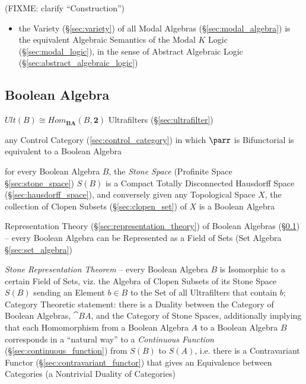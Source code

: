 (FIXME: clarify ``Construction'')

\begin{itemize}
\item the Variety (\S\ref{sec:variety}) of all Modal Algebras
  (\S\ref{sec:modal_algebra}) is the equivalent Algebraic Semantics of the Modal
  $K$ Logic (\S\ref{sec:modal_logic}), in the sense of Abstract Algebraic Logic
  (\S\ref{sec:abstract_algebraic_logic})
\end{itemize}


\subsection{Boolean Algebra}\label{sec:boolean_algebra}

$Ult(B) \cong Hom_\mathbf{BA}(B,\mathbf{2})$ Ultrafilters
(\S\ref{sec:ultrafilter})

any Control Category (\ref{sec:control_category}) in which $\parr$ is
Bifunctorial is equivalent to a Boolean Algebra \cite{selinger01}

for every Boolean Algebra $B$, the \emph{Stone Space} (Profinite Space
\S\ref{sec:stone_space}) $\xspace{S}(B)$ is a Compact Totally Disconnected
Hausdorff Space (\S\ref{sec:hausdorff_space}), and conversely given any
Topological Space $X$, the collection of Clopen Subsets (\S\ref{sec:clopen_set})
of $X$ is a Boolean Algebra

Representation Theory (\S\ref{sec:representation_theory}) of Boolean Algebras
(\S\ref{sec:boolean_algebra}) -- every Boolean Algebra can be Represented as a
Field of Sets (Set Algebra \S\ref{sec:set_algebra})

\emph{Stone Representation Theorem} -- every Boolean Algebra $B$ is Isomorphic
to a certain Field of Sets, viz. the Algebra of Clopen Subsets of its Stone
Space $\xspace{S}(B)$ sending an Element $b \in B$ to the Set of all
Ultrafilters that contain $b$; Category Theoretic statement: there is a Duality
between the Category of Boolean Algebras, $\cat{BA}$, and the Category of Stone
Spaces, additionally implying that each Homomorphism from a Boolean Algebra $A$
to a Boolean Algebra $B$ corresponds in a ``natural way'' to a \emph{Continuous
  Function} (\S\ref{sec:continuous_function}) from $S(B)$ to $S(A)$, i.e. there
is a Contravariant Functor (\S\ref{sec:contravariant_functor}) that gives an
Equivalence between Categories (a Nontrivial Duality of Categories)

